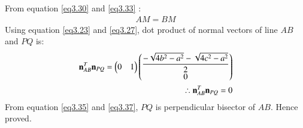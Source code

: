 \documentclass[journal,12pt,twocolumn]{IEEEtran}
\begin{document}
From equation \ref{eq3.30} and \ref{eq3.33} :
\begin{align}
    AM=BM \label{eq3.35}
\end{align}
Using equation \ref{eq3.23} and \ref{eq3.27}, dot product of normal vectors of line $AB$ and $PQ$ is:
\begin{align}
    \mathbf{n}_{AB}^T\mathbf{n}_{PQ}=\begin{pmatrix}0&1\end{pmatrix}\begin{pmatrix}\displaystyle \frac{-\sqrt{4b^2-a^2}-\sqrt{4c^2-a^2}}{2}\\0\end{pmatrix}\\
    \therefore\mathbf{n}_{AB}^T\mathbf{n}_{PQ}=0 \label{eq3.37}
\end{align}
From equation \ref{eq3.35} and \ref{eq3.37}, $PQ$ is perpendicular bisector of $AB$. Hence proved.
\end{document}
